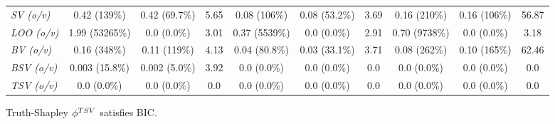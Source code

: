 \begin{table*}[t]
\begin{tabular}{@{}l|ccc|ccc|ccc@{}}
\textit{SV (o/v)} & 0.42 (139\%) & 0.42 (69.7\%) & 5.65 & 0.08 (106\%) & 0.08 (53.2\%) & 3.69 & 0.16 (210\%) & 0.16 (106\%) & 56.87 \\
\textit{LOO (o/v)} & 1.99 (53265\%) & 0.0 (0.0\%) & 3.01 & 0.37 (5539\%) & 0.0 (0.0\%) & 2.91 & 0.70 (9738\%) & 0.0 (0.0\%) & 3.18 \\
\textit{BV (o/v)} & 0.16 (348\%) & 0.11 (119\%) & 4.13 & 0.04 (80.8\%) & 0.03 (33.1\%) & 3.71 & 0.08 (262\%) & 0.10 (165\%) & 62.46 \\
\textit{BSV (o/v)} & 0.003 (15.8\%) & 0.002 (5.0\%) & 3.92 & 0.0 (0.0\%) & 0.0 (0.0\%) & 0.0 & 0.0 (0.0\%) & 0.0 (0.0\%) & 0.0 \\
\textit{TSV (o/v)} & 0.0 (0.0\%) & 0.0 (0.0\%) & 0.0 & 0.0 (0.0\%) & 0.0 (0.0\%) & 0.0 & 0.0 (0.0\%) & 0.0 (0.0\%) & 0.0 \\ \bottomrule
\end{tabular}
\end{table*}

\begin{theorem}
\label{thm:tsv_bic}
    Truth-Shapley $\phi^{TSV}$ satisfies BIC.
\end{theorem}

